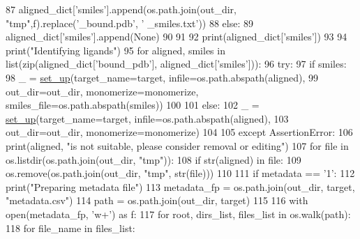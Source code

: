 \begin{DoxyCode}
87                 aligned\_dict[\textcolor{stringliteral}{'smiles'}].append(os.path.join(out\_dir, \textcolor{stringliteral}{"tmp"},f).replace(\textcolor{stringliteral}{'\_bound.pdb'}, \textcolor{stringliteral}{'
      \_smiles.txt'}))
88             \textcolor{keywordflow}{else}:
89                 aligned\_dict[\textcolor{stringliteral}{'smiles'}].append(\textcolor{keywordtype}{None})
90 
91 
92     print(aligned\_dict[\textcolor{stringliteral}{'smiles'}])
93 
94     print(\textcolor{stringliteral}{"Identifying ligands"})
95     \textcolor{keywordflow}{for} aligned, smiles \textcolor{keywordflow}{in} list(zip(aligned\_dict[\textcolor{stringliteral}{'bound\_pdb'}], aligned\_dict[\textcolor{stringliteral}{'smiles'}])):
96         \textcolor{keywordflow}{try}:
97             \textcolor{keywordflow}{if} smiles:
98                 \_ = \hyperlink{namespacefragalysis__api_1_1xcimporter_1_1conversion__pdb__mol_ab8fa8ff14ff0439b99603cbbd33472e2}{set\_up}(target\_name=target, infile=os.path.abspath(aligned),
99                              out\_dir=out\_dir, monomerize=monomerize, smiles\_file=os.path.abspath(smiles))
100                 
101             \textcolor{keywordflow}{else}:
102                 \_ = \hyperlink{namespacefragalysis__api_1_1xcimporter_1_1conversion__pdb__mol_ab8fa8ff14ff0439b99603cbbd33472e2}{set\_up}(target\_name=target, infile=os.path.abspath(aligned),
103                 out\_dir=out\_dir, monomerize=monomerize)
104                 
105         \textcolor{keywordflow}{except} AssertionError:
106             print(aligned, \textcolor{stringliteral}{"is not suitable, please consider removal or editing"})
107             \textcolor{keywordflow}{for} file \textcolor{keywordflow}{in} os.listdir(os.path.join(out\_dir, \textcolor{stringliteral}{"tmp"})):
108                 \textcolor{keywordflow}{if} str(aligned) \textcolor{keywordflow}{in} file:
109                     os.remove(os.path.join(out\_dir, \textcolor{stringliteral}{"tmp"}, str(file)))
110 
111     \textcolor{keywordflow}{if} metadata == \textcolor{stringliteral}{'1'}:
112         print(\textcolor{stringliteral}{"Preparing metadata file"})
113         metadata\_fp = os.path.join(out\_dir, target, \textcolor{stringliteral}{"metadata.csv"})
114         path = os.path.join(out\_dir, target)
115 
116         with open(metadata\_fp, \textcolor{stringliteral}{'w+'}) \textcolor{keyword}{as} f:
117             \textcolor{keywordflow}{for} root, dirs\_list, files\_list \textcolor{keywordflow}{in} os.walk(path):
118                 \textcolor{keywordflow}{for} file\_name \textcolor{keywordflow}{in} files\_list:

\end{DoxyCode}
